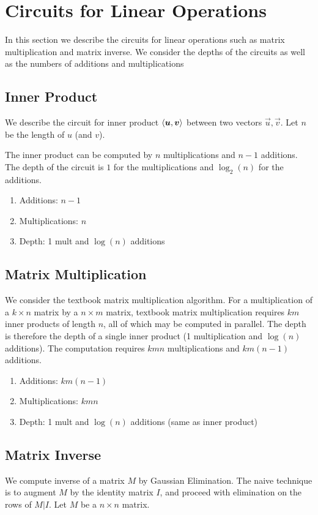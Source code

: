 

\section{Circuits for Linear Operations}
In this section we describe the circuits for linear operations such as matrix multiplication and matrix inverse. We consider the depths of the circuits as well as the numbers of additions and multiplications

\subsection{Inner Product}
We describe the circuit for inner product $\innerproduct{\vec{u}}{\vec{v}}$ between two vectors $\vec{u},\vec{v}$.
Let $n$ be the length of $u$ (and $v$).

The inner product can be computed by $n$ multiplications and $n-1$ additions.
The depth of the circuit is $1$ for the multiplications and $\log_{2}(n)$ for the additions.
\begin{enumerate}
	\item Additions: $n-1$
	\item Multiplications: $n$
	\item Depth: 1 mult and $\log(n)$ additions
\end{enumerate}

\subsection{Matrix Multiplication}
We consider the textbook matrix multiplication algorithm. For a multiplication of a $k \times n$ matrix by a $n \times m$ matrix, textbook matrix multiplication requires $km$ inner products of length $n$, all of which may be computed in parallel.
The depth is therefore the depth of a single inner product (1 multiplication and $\log(n)$ additions).
The computation requires $kmn$ multiplications and $km(n-1)$ additions.

\begin{enumerate}
	\item Additions: $km(n-1)$
	\item Multiplications: $kmn$
	\item Depth: 1 mult and $\log(n)$ additions (same as inner product)
\end{enumerate}

\subsection{Matrix Inverse}
We compute inverse of a matrix $M$ by Gaussian Elimination. The naive technique is to augment $M$ by the identity matrix $I$, and proceed with elimination on the rows of $M | I$. Let $M$ be a $n \times n$ matrix. 



